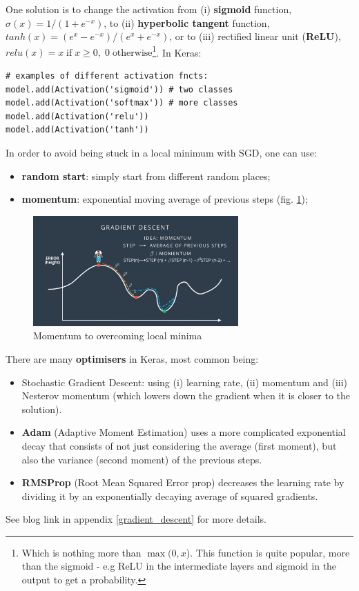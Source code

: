 \documentclass[11pt]{article}
\begin{document}
One solution is to change the activation from (i) \textbf{sigmoid} function, $\sigma(x)=1/(1+e^{-x})$, to (ii) \textbf{hyperbolic tangent} function,  $tanh(x)=(e^{x}-e^{-x})/(e^{x}+e^{-x})$, or to (iii) rectified linear unit (\textbf{ReLU}), $relu(x) = x \; \text{if} \; x\geqslant0, \; 0 \; \text{otherwise}$\footnote{Which is nothing more than $\max(0,x$). This function is quite popular, more than the sigmoid - e.g ReLU in the intermediate layers and sigmoid in the output to get a probability.}. In Keras:
\begin{lstlisting}
# examples of different activation fncts:
model.add(Activation('sigmoid')) # two classes
model.add(Activation('softmax')) # more classes
model.add(Activation('relu'))
model.add(Activation('tanh'))
\end{lstlisting}

In order to avoid being stuck in a local minimum with SGD, one can use:
\begin{itemize}
	\item \textbf{random start}: simply start from different random places;
	\item \textbf{momentum}: exponential moving average of previous steps (fig. \ref{momentum});
\end{itemize}
\begin{figure}[htbp] 
	\centering
	\includegraphics[width=0.7\textwidth]{pics/momentum}
	\caption{Momentum to overcoming local minima} 
	\label{momentum}
\end{figure}

There are many \textbf{optimisers} in Keras, most common being:
\begin{itemize}
	\item Stochastic Gradient Descent: using (i) learning rate, (ii) momentum and (iii) Nesterov momentum (which lowers down the gradient when it is closer to the solution).
	\item \textbf{Adam} (Adaptive Moment Estimation) uses a more complicated exponential decay that consists of not just considering the average (first moment), but also the variance (second moment) of the previous steps.
	\item \textbf{RMSProp} (Root Mean Squared Error prop) decreases the learning rate by dividing it by an exponentially decaying average of squared gradients.
\end{itemize}
See blog link in appendix \ref{gradient_descent} for more details.
\end{document}
